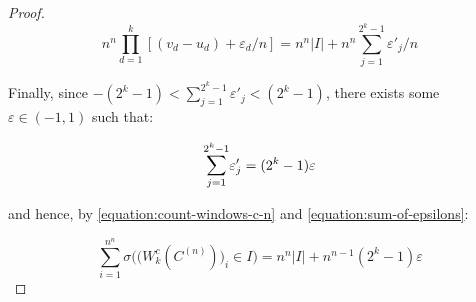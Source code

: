 \documentclass[11pt,a4paper]{tesis}
\theoremstyle{plain}
\theoremstyle{definition}
\begin{document}
\begin{proof}
  \begin{equation}\label{equation:sum-of-epsilons}
    n^n \prod_{d = 1}^{k} [(v_d - u_d) + \varepsilon_d / n] = n^n |I| + n^n \sum_{j = 1}^{2^k - 1} \varepsilon'_j / n
  \end{equation}

  Finally, since $- (2^k - 1) < \sum_{j = 1}^{2^k - 1} \varepsilon'_j < (2^k - 1)$, there exists some $\varepsilon \in (-1, 1)$ such that:

  \begin{equation*}
    \mathlarger{\sum}_{j = 1}^{2^k - 1} \varepsilon'_j = (2^k - 1) \varepsilon
  \end{equation*}

  and hence, by \ref{equation:count-windows-c-n} and \ref{equation:sum-of-epsilons}:

  \begin{equation*}
    \sum_{i = 1}^{n^n} \sigma\Big( \big( W_k^{c}(C^{(n)}) \big)_i \in I \Big) = n^n |I| + n^{n - 1} (2^k - 1) \varepsilon
  \end{equation*}
\end{proof}
\end{document}
